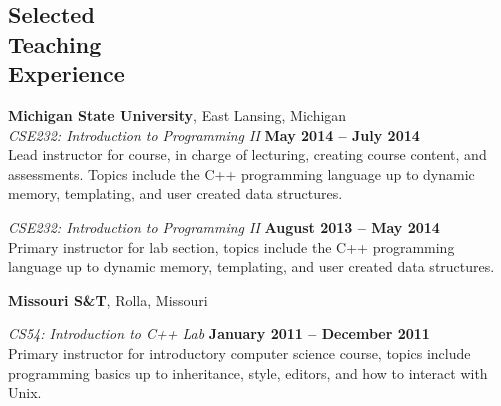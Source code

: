 \documentclass[margin,line]{resume}
\begin{document}
\begin{resume}
    \section{\mysidestyle Selected\\Teaching\\Experience}
    \textbf{Michigan State University}, East Lansing, Michigan \vspace{2mm}\\\vspace{1mm}%
    \textsl{CSE232: Introduction to Programming II} \hfill \textbf{May 2014 -- July 2014}\\
    Lead instructor for course, in charge of lecturing, creating course content, and assessments.
    Topics include the C++ programming language up to dynamic memory, templating, and user created data structures.

    \textsl{CSE232: Introduction to Programming II} \hfill \textbf{August 2013 -- May 2014}\\
    Primary instructor for lab section,
    topics include the C++ programming language up to dynamic memory, templating, and user created data structures.

    \pagebreak

    \textbf{Missouri S\&T}, Rolla, Missouri \vspace{2mm}\\\vspace{1mm}%
    \begin{comment}
    \textsl{CS328: Object Oriented Numerical Methods} \hfill \textbf{January 2012 -- present}\\
    Grader for intensive C++ course,
    topics include advanced programming techniques and how to efficiently solve large systems of equations.
    \end{comment}
    \textsl{CS54: Introduction to C++ Lab} \hfill \textbf{January 2011 -- December 2011}\\
    Primary instructor for introductory computer science course,
    topics include programming basics up to inheritance, style, editors, and how to interact with Unix.
    \begin{comment}
    \textsl{CS387: Parallel Computing} \hfill \textbf{January 2011 -- May 2011}\\
    Teaching assistant for parallel computation course,
    topics include MPI, cluster computing, GPUs, Monte Carlo experiments, and high performance computing.
    \end{comment}
    

\end{resume}
\end{document}
